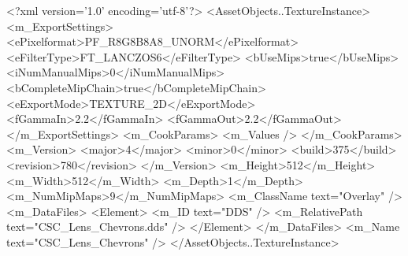 <?xml version='1.0' encoding='utf-8'?>
<AssetObjects..TextureInstance>
  <m_ExportSettings>
    <ePixelformat>PF_R8G8B8A8_UNORM</ePixelformat>
    <eFilterType>FT_LANCZOS6</eFilterType>
    <bUseMips>true</bUseMips>
    <iNumManualMips>0</iNumManualMips>
    <bCompleteMipChain>true</bCompleteMipChain>
    <eExportMode>TEXTURE_2D</eExportMode>
    <fGammaIn>2.2</fGammaIn>
    <fGammaOut>2.2</fGammaOut>
  </m_ExportSettings>
  <m_CookParams>
    <m_Values />
  </m_CookParams>
  <m_Version>
    <major>4</major>
    <minor>0</minor>
    <build>375</build>
    <revision>780</revision>
  </m_Version>
  <m_Height>512</m_Height>
  <m_Width>512</m_Width>
  <m_Depth>1</m_Depth>
  <m_NumMipMaps>9</m_NumMipMaps>
  <m_ClassName text="Overlay" />
  <m_DataFiles>
    <Element>
      <m_ID text="DDS" />
      <m_RelativePath text="CSC_Lens_Chevrons.dds" />
    </Element>
  </m_DataFiles>
  <m_Name text="CSC_Lens_Chevrons" />
</AssetObjects..TextureInstance>
